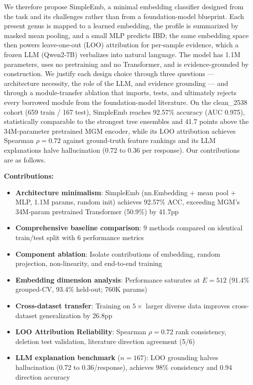 \documentclass[11pt,a4paper]{article}
\begin{document}
We therefore propose SimpleEmb, a minimal embedding classifier designed from the task and its challenges rather than from a foundation-model blueprint. Each present genus is mapped to a learned embedding, the profile is summarized by masked mean pooling, and a small MLP predicts IBD; the same embedding space then powers leave-one-out (LOO) attribution for per-sample evidence, which a frozen LLM (Qwen2-7B) verbalizes into natural language. The model has 1.1M parameters, uses no pretraining and no Transformer, and is evidence-grounded by construction. We justify each design choice through three questions --- architecture necessity, the role of the LLM, and evidence grounding --- and through a module-transfer ablation that imports, tests, and ultimately rejects every borrowed module from the foundation-model literature. On the clean\_2538 cohort (659 train / 167 test), SimpleEmb reaches 92.57\% accuracy (AUC 0.975), statistically comparable to the strongest tree ensembles and 41.7 points above the 34M-parameter pretrained MGM encoder, while its LOO attribution achieves Spearman $\rho{=}0.72$ against ground-truth feature rankings and its LLM explanations halve hallucination (0.72 to 0.36 per response). Our contributions are as follows.


\textbf{Contributions:}
\begin{itemize}
  \item \textbf{Architecture minimalism}: SimpleEmb (nn.Embedding + mean pool + MLP, 1.1M params, random init) achieves 92.57\% ACC, exceeding MGM's 34M-param pretrained Transformer (50.9\%) by 41.7pp
  \item \textbf{Comprehensive baseline comparison}: 9 methods compared on identical train/test split with 6 performance metrics
  \item \textbf{Component ablation}: Isolate contributions of embedding, random projection, non-linearity, and end-to-end training
  \item \textbf{Embedding dimension analysis}: Performance saturates at $E{=}512$ (91.4\% grouped-CV, 93.4\% held-out; 760K params)
  \item \textbf{Cross-dataset transfer}: Training on $5\times$ larger diverse data improves cross-dataset generalization by 26.8pp
  \item \textbf{LOO Attribution Reliability}: Spearman $\rho{=}0.72$ rank consistency, deletion test validation, literature direction agreement (5/6)
  \item \textbf{LLM explanation benchmark} ($n{=}167$): LOO grounding halves hallucination (0.72 to 0.36/response), achieves 98\% consistency and 0.94 direction accuracy
\end{itemize}
\end{document}
